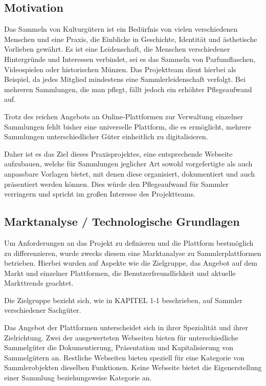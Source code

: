 \subsection{Motivation}\label{subsec:Motivation}


Das Sammeln von Kulturgütern ist ein Bedürfnis von vielen verschiedenen Menschen und eine Praxis, die Einblicke in Geschichte, Identität und ästhetische Vorlieben gewährt.
Es ist eine Leidenschaft, die Menschen verschiedener Hintergründe und Interessen verbindet, sei es das Sammeln von Parfumflaschen, Videospielen oder historischen Münzen.
Das Projektteam dient hierbei als Beispiel, da jedes Mitglied mindestens eine Sammlerleidenschaft verfolgt.
Bei mehreren Sammlungen, die man pflegt, fällt jedoch ein erhöhter Pflegeaufwand auf. \par
Trotz des reichen Angebots an Online-Plattformen zur Verwaltung einzelner Sammlungen fehlt bisher eine universelle Plattform, die es ermöglicht, mehrere Sammlungen unterschiedlicher Güter einheitlich zu digitalisieren. \par
Daher ist es das Ziel dieses Praxisprojektes, eine entsprechende Webseite aufzubauen, welche für Sammlungen jeglicher Art sowohl vorgefertigte als auch anpassbare Vorlagen bietet, mit denen diese organisiert, dokumentiert und auch präsentiert werden können.
Dies würde den Pflegeaufwand für Sammler verringern und spricht im großen Interesse des Projektteams.


\subsection{Marktanalyse / Technologische Grundlagen}\label{subsec:Marktanalyse-TechnologischeGrundlagen}

Um Anforderungen an das Projekt zu definieren und die Plattform bestmöglich zu differenzieren, wurde zwecks diesem eine Marktanalyse zu Sammlerplattformen betrieben.
Hierbei wurden auf Aspekte wie die Zielgruppe, das Angebot auf dem Markt und einzelner Plattformen, die Benutzerfreundlichkeit und aktuelle Markttrends geachtet. \par
Die Zielgruppe bezieht sich, wie in KAPITEL 1-1 beschrieben, auf Sammler verschiedener Sachgüter. \linebreak


Das Angebot der Plattformen unterscheidet sich in ihrer Spezialität und ihrer Zielrichtung. Zwei der ausgewerteten Webseiten bieten für unterschiedliche Sammelgüter die Dokumentierung, Präsentation und Kapitalisierung von Sammelgütern an.
Restliche Webseiten bieten speziell für eine Kategorie von Sammlerobjekten dieselben Funktionen.
Keine Webseite bietet die Eigenerstellung einer Sammlung beziehungsweise Kategorie an. \par

